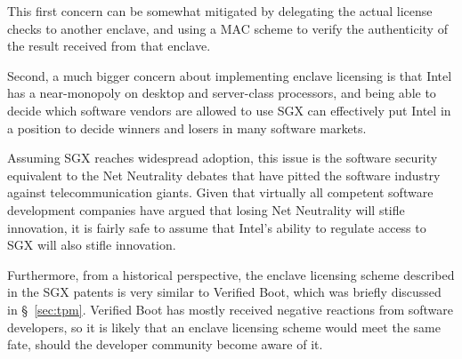 This first concern can be somewhat mitigated by delegating the actual license
checks to another enclave, and using a MAC scheme to verify the authenticity of
the result received from that enclave.

Second, a much bigger concern about implementing enclave licensing is that
Intel has a near-monopoly on desktop and server-class processors, and being
able to decide which software vendors are allowed to use SGX can effectively
put Intel in a position to decide winners and losers in many software markets.

Assuming SGX reaches widespread adoption, this issue is the software security
equivalent to the Net Neutrality debates that have pitted the software industry
against telecommunication giants. Given that virtually all competent software
development companies have argued that losing Net Neutrality will stifle
innovation, it is fairly safe to assume that Intel's ability to regulate access
to SGX will also stifle innovation.

Furthermore, from a historical perspective, the enclave licensing scheme
described in the SGX patents is very similar to Verified Boot, which was
briefly discussed in \S~\ref{sec:tpm}. Verified Boot has mostly received
negative reactions from software developers, so it is likely that an enclave
licensing scheme would meet the same fate, should the developer community
become aware of it.
